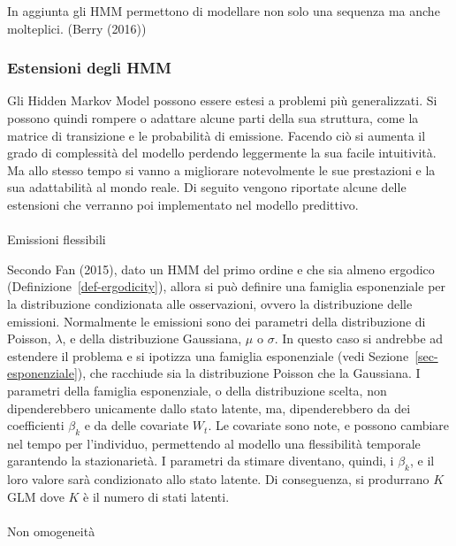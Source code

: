 \documentclass[
  italian,
  a4paper,
  a4paper,
  twoside,
  open=right,
  12pt]{scrbook}
\makeatletter
\let\oldparagraph\paragraph
\renewcommand{\paragraph}{
    \@ifstar
      \xxxParagraphStar
      \xxxParagraphNoStar
  }
\newcommand{\xxxParagraphStar}[1]{\oldparagraph*{#1}\mbox{}}
\newcommand{\xxxParagraphNoStar}[1]{\oldparagraph{#1}\mbox{}}
\theoremstyle{definition}
\theoremstyle{remark}
\makeatother
\begin{document}
In aggiunta gli HMM permettono di modellare non solo una sequenza ma
anche molteplici. (Berry (2016))

\subsubsection{Estensioni degli HMM}\label{estensioni-degli-hmm}

Gli Hidden Markov Model possono essere estesi a problemi più
generalizzati. Si possono quindi rompere o adattare alcune parti della
sua struttura, come la matrice di transizione e le probabilità di
emissione. Facendo ciò si aumenta il grado di complessità del modello
perdendo leggermente la sua facile intuitività. Ma allo stesso tempo si
vanno a migliorare notevolmente le sue prestazioni e la sua adattabilità
al mondo reale. Di seguito vengono riportate alcune delle estensioni che
verranno poi implementato nel modello predittivo.

\paragraph{Emissioni flessibili}\label{sec-emissioni-flessibili}

Secondo Fan (2015), dato un HMM del primo ordine e che sia almeno
ergodico (Definizione~\ref{def-ergodicity}), allora si può definire una
famiglia esponenziale per la distribuzione condizionata alle
osservazioni, ovvero la distribuzione delle emissioni. Normalmente le
emissioni sono dei parametri della distribuzione di Poisson,
\(\lambda\), e della distribuzione Gaussiana, \(\mu\) o \(\sigma\). In
questo caso si andrebbe ad estendere il problema e si ipotizza una
famiglia esponenziale (vedi Sezione~\ref{sec-esponenziale}), che
racchiude sia la distribuzione Poisson che la Gaussiana. I parametri
della famiglia esponenziale, o della distribuzione scelta, non
dipenderebbero unicamente dallo stato latente, ma, dipenderebbero da dei
coefficienti \(\beta_k\) e da delle covariate \(W_{t}\). Le covariate
sono note, e possono cambiare nel tempo per l'individuo, permettendo al
modello una flessibilità temporale garantendo la stazionarietà. I
parametri da stimare diventano, quindi, i \(\beta_k\), e il loro valore
sarà condizionato allo stato latente. Di conseguenza, si produrrano
\(K\) GLM dove \(K\) è il numero di stati latenti.

\paragraph{Non omogeneità}\label{non-omogeneituxe0}
\end{document}
